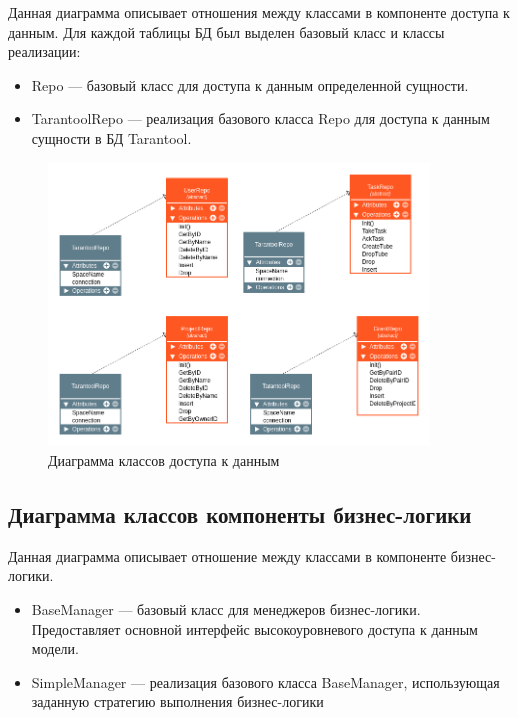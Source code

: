 Данная диаграмма описывает отношения между классами в компоненте доступа к данным.
Для каждой таблицы БД был выделен базовый класс и классы реализации:

\begin{itemize}
    \item Repo --- базовый класс для доступа к данным определенной сущности.
    \item TarantoolRepo --- реализация базового класса Repo для доступа к данным сущности в БД Tarantool.
\end{itemize}

\begin{figure}[h!]
    \includegraphics[width=0.9\textwidth]{./dataaccess.png}
    \caption{Диаграмма классов доступа к данным}
\end{figure}


\subsection{Диаграмма классов компоненты бизнес-логики}

Данная диаграмма описывает отношение между
классами в компоненте бизнес-логики.

\begin{itemize}
    \item BaseManager --- базовый класс для менеджеров бизнес-логики. 
        Предоставляет основной интерфейс высокоуровневого доступа 
        к данным модели.

    \item SimpleManager --- реализация базового класса BaseManager, использующая заданную стратегию выполнения бизнес-логики
\end{itemize}


